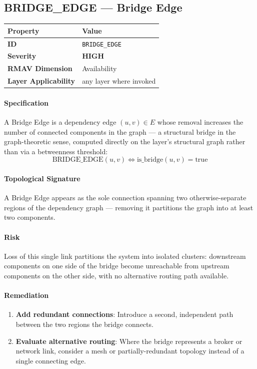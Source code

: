 \documentclass[11pt]{article}
\makeatletter
\newcommand{\HIGH}{\textcolor{orange!80!black}{\textbf{HIGH}}}
\newcommand{\patternprop}[4]{%
  \begin{center}
  \begin{tabular}{@{}ll@{}}
  \toprule
  \textbf{Property} & \textbf{Value} \\
  \midrule
  \textbf{ID} & \texttt{#1} \\
  \textbf{Severity} & #2 \\
  \textbf{RMAV Dimension} & #3 \\
  \textbf{Layer Applicability} & #4 \\
  \bottomrule
  \end{tabular}
  \end{center}
}
\makeatother
\begin{document}
\subsection{BRIDGE\_EDGE --- Bridge Edge}
\patternprop{BRIDGE\_EDGE}{\HIGH}{Availability}{any layer where invoked}

\paragraph{Specification}
A Bridge Edge is a dependency edge $(u,v) \in E$ whose removal increases the number of connected components in the graph --- a structural bridge in the graph-theoretic sense, computed directly on the layer's structural graph rather than via a betweenness threshold:
\[
\mathrm{BRIDGE\_EDGE}(u,v) \Leftrightarrow \mathrm{is\_bridge}(u,v) = \mathrm{true}
\]

\paragraph{Topological Signature}
A Bridge Edge appears as the sole connection spanning two otherwise-separate regions of the dependency graph --- removing it partitions the graph into at least two components.

\paragraph{Risk}
Loss of this single link partitions the system into isolated clusters: downstream components on one side of the bridge become unreachable from upstream components on the other side, with no alternative routing path available.

\paragraph{Remediation}
\begin{enumerate}[leftmargin=*]
\item \textbf{Add redundant connections}: Introduce a second, independent path between the two regions the bridge connects.
\item \textbf{Evaluate alternative routing}: Where the bridge represents a broker or network link, consider a mesh or partially-redundant topology instead of a single connecting edge.
\end{enumerate}
\end{document}
